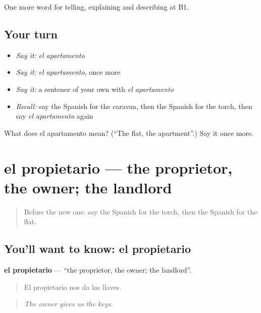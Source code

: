 \begin{grammarlens}[title={What you've built}]
One more word for telling, explaining and describing at B1.
\end{grammarlens}

\subsection*{Your turn}
\begin{itemize}
\raggedright
  \item \emph{Say it:} \emph{el apartamento}
  \item \emph{Say it:} \emph{el apartamento}, once more
  \item \emph{Say it:} a sentence of your own with \emph{el apartamento}
  \item \emph{Recall:} say the Spanish for the caravan, then the Spanish for the torch, then say \emph{el apartamento} again
\end{itemize}

\begin{tcolorbox}[breakable,colback=teal!4,colframe=teal!35!black,title={Before you move on}]
What does el apartamento mean? (\textquotedblleft{}The flat, the apartment\textquotedblright{}.) Say it once more.
\end{tcolorbox}
\section[el propietario]{el propietario — the proprietor, the owner; the landlord}

\label{lesson:ES-C667-propietario}



\begin{quote}
Before the new one: say the Spanish for the torch, then the Spanish for the flat.
\end{quote}

\subsection*{You'll want to know: el propietario}
\textbf{el propietario} — \textquotedblleft{}the proprietor, the owner; the landlord\textquotedblright{}.

\begin{quote}
El propietario nos da las llaves.
\end{quote}

\begin{quote}
\emph{The owner gives us the keys.}
\end{quote}

